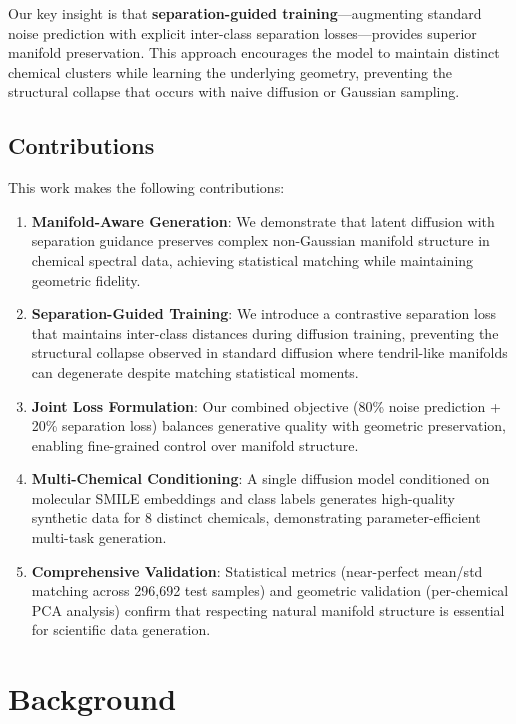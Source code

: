 \documentclass[sigconf]{acmart}
\begin{document}
Our key insight is that \textbf{separation-guided training}—augmenting standard noise prediction with explicit inter-class separation losses—provides superior manifold preservation. This approach encourages the model to maintain distinct chemical clusters while learning the underlying geometry, preventing the structural collapse that occurs with naive diffusion or Gaussian sampling.

\subsection{Contributions}

This work makes the following contributions:

\begin{enumerate}
    \item \textbf{Manifold-Aware Generation}: We demonstrate that latent diffusion with separation guidance preserves complex non-Gaussian manifold structure in chemical spectral data, achieving statistical matching while maintaining geometric fidelity.
    
    \item \textbf{Separation-Guided Training}: We introduce a contrastive separation loss that maintains inter-class distances during diffusion training, preventing the structural collapse observed in standard diffusion where tendril-like manifolds can degenerate despite matching statistical moments.
    
    \item \textbf{Joint Loss Formulation}: Our combined objective (80\% noise prediction + 20\% separation loss) balances generative quality with geometric preservation, enabling fine-grained control over manifold structure.
    
    \item \textbf{Multi-Chemical Conditioning}: A single diffusion model conditioned on molecular SMILE embeddings and class labels generates high-quality synthetic data for 8 distinct chemicals, demonstrating parameter-efficient multi-task generation.
    
    \item \textbf{Comprehensive Validation}: Statistical metrics (near-perfect mean/std matching across 296,692 test samples) and geometric validation (per-chemical PCA analysis) confirm that respecting natural manifold structure is essential for scientific data generation.
\end{enumerate}

\section{Background}
\end{document}
